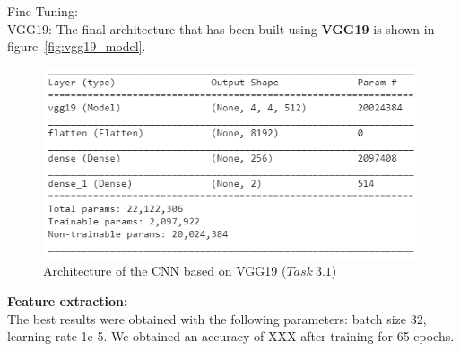 \documentclass[11pt,a4paper,oneside]{article}
\begin{document}
Fine Tuning:\\


VGG19: 
The final architecture that has been built using \textbf{VGG19} is shown in figure~\ref{fig:vgg19_model}. 

\begin{figure}[h]
\centering
\includegraphics[width=.5\textwidth]{images/Task 3/VGG19 3.1/Model}
\caption{Architecture of the CNN based on VGG19 ($Task\ 3.1$)}
\label{fig:vgg16_model}
\end{figure}

\textbf{Feature extraction:}\\
The best results were obtained with the following parameters: batch size 32, learning rate 1e-5. We obtained an accuracy of XXX after training for 65 epochs.
\end{document}
